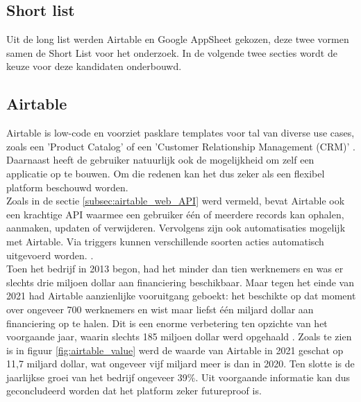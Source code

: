 \subsection{Short list}

Uit de long list werden Airtable en Google AppSheet gekozen, deze twee vormen samen de Short List voor het onderzoek. In de volgende twee secties wordt de keuze voor deze kandidaten onderbouwd. 

\subsection{Airtable} 

Airtable is low-code en voorziet pasklare templates voor tal van diverse use cases, zoals een 'Product Catalog' of een 'Customer Relationship Management (CRM)' \autocite{Maout2022}. Daarnaast heeft de gebruiker natuurlijk ook de mogelijkheid om zelf een applicatie op te bouwen. Om die redenen kan het dus zeker als een flexibel platform beschouwd worden. \\

Zoals in de sectie \ref{subsec:airtable_web_API} werd vermeld, bevat Airtable ook een krachtige API waarmee een gebruiker één of meerdere records kan ophalen, aanmaken, updaten of verwijderen. Vervolgens zijn ook automatisaties mogelijk met Airtable. Via triggers kunnen verschillende soorten acties automatisch uitgevoerd worden. \autocite{AirtableAutomations2023}. \\

Toen het bedrijf in 2013 begon, had het minder dan tien werknemers en was er slechts drie miljoen dollar aan financiering beschikbaar. Maar tegen het einde van 2021 had Airtable aanzienlijke vooruitgang geboekt: het beschikte op dat moment over ongeveer 700 werknemers en wist maar liefst één miljard dollar aan financiering op te halen. Dit is een enorme verbetering ten opzichte van het voorgaande jaar, waarin slechts 185 miljoen dollar werd opgehaald \autocite{Khemchandani2023}. Zoals te zien is in figuur \ref{fig:airtable_value} werd de waarde van Airtable in 2021 geschat op 11,7 miljard dollar, wat ongeveer vijf miljard meer is dan in 2020. Ten slotte is de jaarlijkse groei van het bedrijf ongeveer 39\%. Uit voorgaande informatie kan dus geconcludeerd worden dat het platform zeker futureproof is. \\

